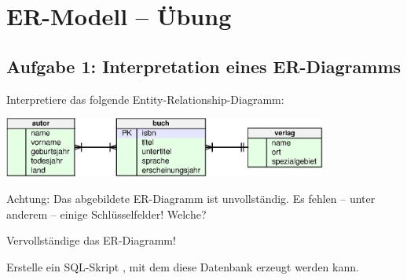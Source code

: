 \clearpage

\rehead[]{\textcolor{lightblue}{AvHG, Inf, My}}
\lohead[]{\textcolor{lightblue}{AvHG, Inf, My}}

\section{ER-Modell -- Übung}

\subsection{Aufgabe 1: Interpretation eines ER-Diagramms}

\begin{compactenum}[a)]
\item Interpretiere das folgende Entity-Relationship-Diagramm:

\vspace{2mm}
\includegraphics[width=0.80\textwidth]{./inf/SEKII/34_SQL_ER-Diagramme/ermAufgabe1.eps}
\vspace{2mm}

Achtung: Das abgebildete ER-Diagramm ist unvollständig. Es fehlen -- unter
anderem -- einige Schlüsselfelder! Welche?

Vervollständige das ER-Diagramm!

\vspace{1mm}

\item Erstelle ein SQL-Skript , mit dem diese
Datenbank erzeugt werden kann.
\end{compactenum}


